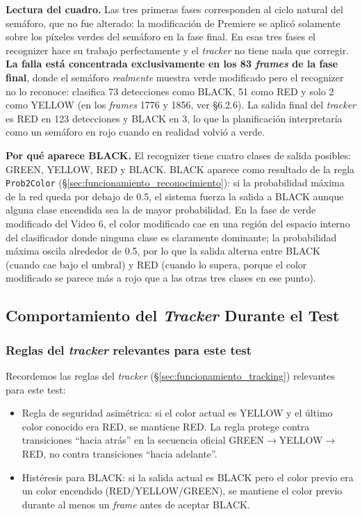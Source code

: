 \textbf{Lectura del cuadro.} Las tres primeras fases corresponden al ciclo natural del semáforo, que no fue alterado: la modificación de Premiere se aplicó solamente sobre los píxeles verdes del semáforo en la fase final. En esas tres fases el recognizer hace su trabajo perfectamente y el \textit{tracker} no tiene nada que corregir. \textbf{La falla está concentrada exclusivamente en los 83 \textit{frames} de la fase final}, donde el semáforo \textit{realmente} muestra verde modificado pero el recognizer no lo reconoce: clasifica 73 detecciones como BLACK, 51 como RED y solo 2 como YELLOW (en los \textit{frames} 1776 y 1856, ver §6.2.6). La salida final del \textit{tracker} es RED en 123 detecciones y BLACK en 3, lo que la planificación interpretaría como un semáforo en rojo cuando en realidad volvió a verde.

\textbf{Por qué aparece BLACK.} El recognizer tiene cuatro clases de salida posibles: GREEN, YELLOW, RED y BLACK. BLACK aparece como resultado de la regla \texttt{Prob2Color} (§\ref{sec:funcionamiento_reconocimiento}): si la probabilidad máxima de la red queda por debajo de 0.5, el sistema fuerza la salida a BLACK aunque alguna clase encendida sea la de mayor probabilidad. En la fase de verde modificado del Video 6, el color modificado cae en una región del espacio interno del clasificador donde ninguna clase es claramente dominante; la probabilidad máxima oscila alrededor de 0.5, por lo que la salida alterna entre BLACK (cuando cae bajo el umbral) y RED (cuando lo supera, porque el color modificado se parece más a rojo que a las otras tres clases en ese punto).

\subsection{Comportamiento del \textit{Tracker} Durante el Test}

\subsubsection{Reglas del \textit{tracker} relevantes para este test}

Recordemos las reglas del \textit{tracker} (§\ref{sec:funcionamiento_tracking}) relevantes para este test:

\begin{itemize}
    \item Regla de seguridad asimétrica: si el color actual es YELLOW y el último color conocido era RED, se mantiene RED. La regla protege contra transiciones ``hacia atrás'' en la secuencia oficial GREEN$\to$YELLOW$\to$RED, no contra transiciones ``hacia adelante''.
    \item Histéresis para BLACK: si la salida actual es BLACK pero el color previo era un color encendido (RED/YELLOW/GREEN), se mantiene el color previo durante al menos un \textit{frame} antes de aceptar BLACK.
\end{itemize}

